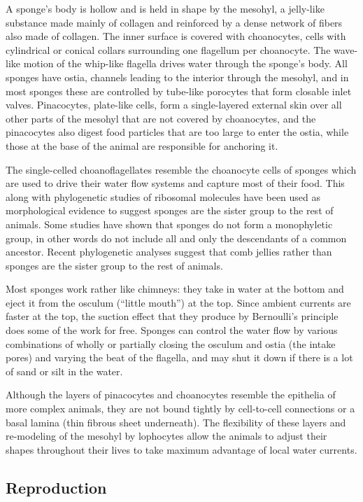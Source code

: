\documentclass[]{book}
\begin{document}
A sponge's body is hollow and is held in shape by the mesohyl, a jelly-like substance made mainly of collagen and reinforced by a dense network of fibers also made of collagen. The inner surface is covered with choanocytes, cells with cylindrical or conical collars surrounding one flagellum per choanocyte. The wave-like motion of the whip-like flagella drives water through the sponge's body. All sponges have ostia, channels leading to the interior through the mesohyl, and in most sponges these are controlled by tube-like porocytes that form closable inlet valves. Pinacocytes, plate-like cells, form a single-layered external skin over all other parts of the mesohyl that are not covered by choanocytes, and the pinacocytes also digest food particles that are too large to enter the ostia, while those at the base of the animal are responsible for anchoring it.

The single-celled choanoflagellates resemble the choanocyte cells of sponges which are used to drive their water flow systems and capture most of their food. This along with phylogenetic studies of ribosomal molecules have been used as morphological evidence to suggest sponges are the sister group to the rest of animals. Some studies have shown that sponges do not form a monophyletic group, in other words do not include all and only the descendants of a common ancestor. Recent phylogenetic analyses suggest that comb jellies rather than sponges are the sister group to the rest of animals.

Most sponges work rather like chimneys: they take in water at the bottom and eject it from the osculum (``little mouth'') at the top. Since ambient currents are faster at the top, the suction effect that they produce by Bernoulli's principle does some of the work for free. Sponges can control the water flow by various combinations of wholly or partially closing the osculum and ostia (the intake pores) and varying the beat of the flagella, and may shut it down if there is a lot of sand or silt in the water.

Although the layers of pinacocytes and choanocytes resemble the epithelia of more complex animals, they are not bound tightly by cell-to-cell connections or a basal lamina (thin fibrous sheet underneath). The flexibility of these layers and re-modeling of the mesohyl by lophocytes allow the animals to adjust their shapes throughout their lives to take maximum advantage of local water currents.

\hypertarget{reproduction-1}{%
\subsection{Reproduction}\label{reproduction-1}}
\end{document}
